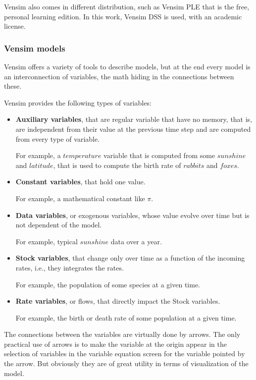 Vensim also comes in different distribution, such as Vensim PLE that is the free, personal learning edition. In this work, Vensim DSS is used, with an academic license.


\subsubsection{Vensim models}

Vensim offers a variety of tools to describe models, but at the end every model is an interconnection of variables, the math hiding in the connections between these. 

Vensim provides the following types of variables:
\begin{itemize}
    \item \textbf{Auxiliary variables}, that are regular variable that have no memory, that is, are independent from their value at the previous time step and are computed from every type of variable.

    For example, a $temperature$ variable that is computed from some $sunshine$ and $latitude$, that is used to compute the birth rate of $rabbits$ and $foxes$.

    \item \textbf{Constant variables}, that hold one value.
    
    For example, a mathematical constant like $\pi$.

    \item \textbf{Data variables}, or exogenous variables, whose value evolve over time but is not dependent of the model.

    For example, typical $sunshine$ data over a year.

    \item \textbf{Stock variables}, that change only over time as a function of the incoming rates, i.e., they integrates the rates.

    For example, the population of some species at a given time.

    \item \textbf{Rate variables}, or flows, that directly impact the Stock variables. 

    For example, the birth or death rate of some population at a given time.
\end{itemize}

The connections between the variables are virtually done by arrows. The only practical use of arrows is to make the variable at the origin appear in the selection of variables in the variable equation screen for the variable pointed by the arrow. But obviously they are of great utility in terms of visualization of the model.

